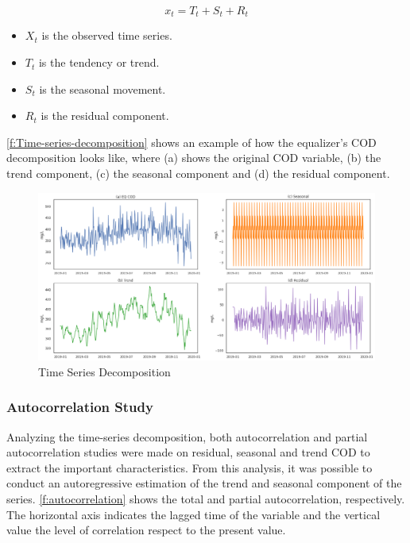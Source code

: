 \begin{equation}\label{eq:time-series-decomposition}
    x_t = T_t + S_t + R_t
\end{equation}

\begin{itemize}
    \item \begin{math}X_t\end{math} is the observed time series.
    \item \begin{math}T_t\end{math} is the tendency or trend.
    \item \begin{math}S_t\end{math} is the seasonal movement.
    \item \begin{math}R_t\end{math} is the residual component.
\end{itemize}

\autoref{f:Time-series-decomposition} shows an example of how the equalizer’s COD decomposition looks like, where (a) shows the original COD variable, (b) the trend component, (c) the seasonal component and (d) the residual component.

\begin{figure}[h]
\centering
\includegraphics[width=\linewidth]{figures/Ch4/time_series_descompose.png}
\caption{Time Series Decomposition}
\label{f:Time-series-decomposition}
\end{figure}

\subsubsection{Autocorrelation Study}
Analyzing the time-series decomposition, both autocorrelation and partial autocorrelation studies were made on residual, seasonal and trend COD to extract the important characteristics. From this analysis, it was possible to conduct an autoregressive estimation of the trend and seasonal component of the series. \autoref{f:autocorrelation} shows the total and partial autocorrelation, respectively. The horizontal axis indicates the lagged time of the variable and the vertical value the level of correlation respect to the present value.


